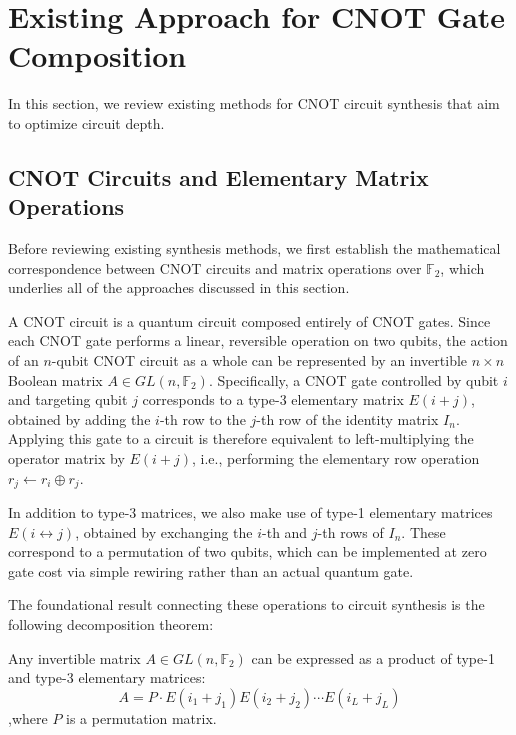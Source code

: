 \chapter{Existing Approach for CNOT Gate Composition}
\label{ch:existing-approaches}

In this section, we review existing methods for CNOT circuit synthesis that aim to optimize circuit depth.

\section{CNOT Circuits and Elementary Matrix Operations}\label{sec:CNOT-transformation-to-Matrix-Operations}
Before reviewing existing synthesis methods, we first establish the mathematical correspondence between CNOT circuits and matrix operations over $\mathbb{F}_{2}$, which underlies all of the approaches discussed in this section.

A CNOT circuit is a quantum circuit composed entirely of CNOT gates. Since each CNOT gate performs a linear, reversible operation on two qubits, the action of an $n$-qubit CNOT circuit as a whole can be represented by an invertible $n \times n$ Boolean matrix $A \in GL(n, \mathbb{F}_{2})$. Specifically, a CNOT gate controlled by qubit $i$ and targeting qubit $j$ corresponds to a type-3 elementary matrix $E(i+j)$, obtained by adding the $i$-th row to the $j$-th row of the identity matrix $I_{n}$. Applying this gate to a circuit is therefore equivalent to left-multiplying the operator matrix by $E(i+j)$, i.e., performing the elementary row operation $r_{j} \leftarrow r_{i} \oplus r_{j}$.

In addition to type-3 matrices, we also make use of type-1 elementary matrices $E(i \leftrightarrow j)$, obtained by exchanging the $i$-th and $j$-th rows of $I_{n}$. These correspond to a permutation of two qubits, which can be implemented at zero gate cost via simple rewiring rather than an actual quantum gate.

The foundational result connecting these operations to circuit synthesis is the following decomposition theorem:


\begin{theorem}
Any invertible matrix \(A \in GL(n, \mathbb{F}_{2})\) can be expressed as a product of type-1 and type-3 elementary matrices:
	\begin{equation}
		\label{eq:elementary-matrix-operation-type-1-and-3}
		A = P \cdot E(i_{1} + j_{1})E(i_{2} + j_{2}) \cdots E(i_{L} + j_{L})
	\end{equation}
,where \(P\) is a permutation matrix.
\end{theorem}


